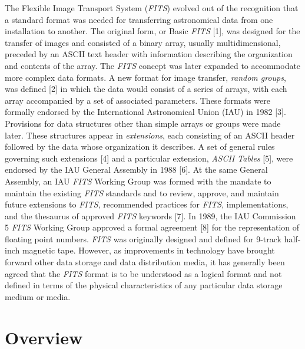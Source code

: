   The Flexible Image Transport System ({\em FITS\/}) evolved out of the
  recognition that a standard format was needed for 
  transferring astronomical data from one installation to another.  The 
  original
  form, or Basic {\em FITS\/} [1], was designed for 
  the transfer of images and
  consisted of a binary array, usually multidimensional, preceded by
  an ASCII text header with information 
  describing the organization and contents of the array.  
  The {\em FITS\/} concept was later expanded to
  accommodate more complex data formats.   
  A new format for image transfer, {\em random groups}, was defined [2] 
  in which the data
  would consist of a series of arrays, 
  with each
  array accompanied by
  a set of associated
  parameters.  These formats were formally
  endorsed by the International Astronomical Union
  (IAU) in 1982 [3]. Provisions for data structures 
  other than simple arrays or groups
  were made later.  These structures appear
  in {\em extensions}, each  consisting of an ASCII header 
  followed by the data whose organization it describes.  
  A set of general rules governing such extensions [4] and 
  a particular 
  extension, {\em ASCII Tables} [5], were endorsed
  by the IAU General Assembly in 1988 [6].  At the same 
  General
  Assembly, an IAU {\em FITS\/} 
  Working Group was formed with the 
  mandate to maintain the existing {\em FITS\/} standards and to review, 
  approve, and maintain future extensions to {\em FITS}, 
  recommended practices for {\em FITS}, implementations, and the 
  thesaurus of approved {\em FITS\/} keywords [7].  In 1989, the 
  IAU Commission
  5 {\em FITS\/} Working Group approved a formal agreement [8] for the 
  representation of floating point
  numbers.
  {\em FITS\/} was originally designed and defined for 9-track 
  half-inch
  magnetic tape. However, as improvements in technology have brought
  forward other data storage and data distribution media, it has
  generally been agreed that the {\em FITS\/} format is to be
  understood as a logical format and not defined in terms of the
  physical characteristics of any particular data storage medium or
  media. 
  
\chapter{Overview}
\startstandard
  
